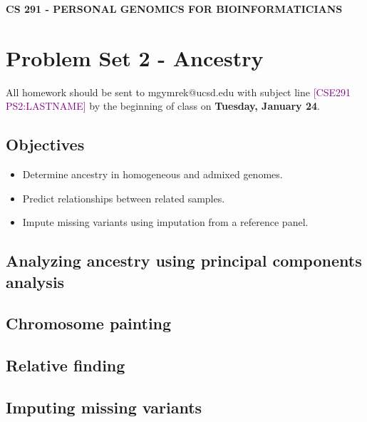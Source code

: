 \documentclass[12pt]{article}
\begin{document}
\textbf{CS 291 - PERSONAL GENOMICS FOR BIOINFORMATICIANS}

\section*{Problem Set 2 - Ancestry}

All homework should be sent to mgymrek@ucsd.edu with subject line \textcolor{purple}{[CSE291 PS2:LASTNAME]} by the beginning of class on \textbf{Tuesday, January 24}. %

\subsection*{Objectives}
\begin{itemize}
\item Determine ancestry in homogeneous and admixed genomes.
\item Predict relationships between related samples.
\item Impute missing variants using imputation from a reference panel.
\end{itemize}

\subsection*{Analyzing ancestry using principal components analysis}



\subsection*{Chromosome painting}

\subsection*{Relative finding}

\subsection*{Imputing missing variants}
\end{document}
